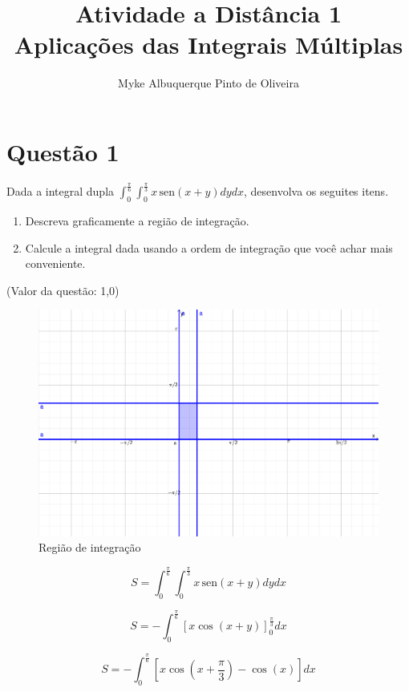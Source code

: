 \documentclass[10pt,a4paper]{article}
\author{Myke Albuquerque Pinto de Oliveira}
\title{\Huge Atividade a Distância 1 \\ 
	Aplicações das Integrais Múltiplas}
\newcommand{\sen}{\hspace{2pt}\textrm{sen}}
\begin{document}
	
	\maketitle
	\newpage
	
	\section*{Questão 1}
	
	Dada a integral dupla $ \int_{0}^{\frac{\pi}{6}} \int_{0}^{\frac{\pi}{3}} x \sen (x + y) dy dx $, desenvolva os seguites itens.
	
	\begin{enumerate}[a]
		\item Descreva graficamente a região de integração.
		\item Calcule a integral dada usando a ordem de integração que você achar mais conveniente.
	\end{enumerate}
	
	(Valor da questão: 1,0)
	
	\begin{figure}[h]
		\centering
		\includegraphics[width=0.7\linewidth]{fig/integrais-multiplas-1a}
		\caption{Região de integração}
		\label{fig:integrais-multiplas-1a}
	\end{figure}
	
	\begin{equation*}
		S = \int_{0}^{\frac{\pi}{6}} \int_{0}^{\frac{\pi}{3}} x \sen (x + y) dy dx
	\end{equation*}
	
	\begin{equation*}
		S = - \int_{0}^{\frac{\pi}{6}} \left[ x \cos (x + y) \right]_0^{\frac{\pi}{3}} dx
	\end{equation*}
	
	\begin{equation*}
		S = - \int_{0}^{\frac{\pi}{6}} \left[ x \cos \left(x + \frac{\pi}{3}\right) - \cos (x) \right] dx
	\end{equation*}
	
\end{document}
